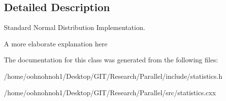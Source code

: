 \subsection{Detailed Description}
Standard Normal Distribution Implementation. 

A more elaborate explanation here 

The documentation for this class was generated from the following files\+:\begin{DoxyCompactItemize}
\item 
/home/oohnohnoh1/\+Desktop/\+G\+I\+T/\+Research/\+Parallel/include/statistics.\+h\item 
/home/oohnohnoh1/\+Desktop/\+G\+I\+T/\+Research/\+Parallel/src/statistics.\+cxx\end{DoxyCompactItemize}
